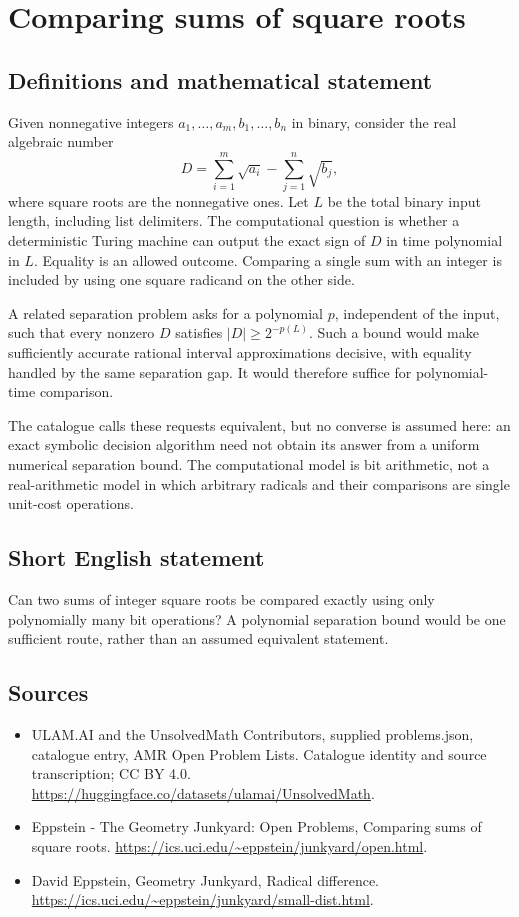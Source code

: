 \documentclass[11pt,a4paper]{article}
\begin{document}
\section*{Comparing sums of square roots}\label{statement}

\subsection{Definitions and mathematical statement}
Given nonnegative integers $a_1,\ldots,a_m,b_1,\ldots,b_n$ in binary,
consider the real algebraic number
\[
 D=\sum_{i=1}^m\sqrt{a_i}-\sum_{j=1}^n\sqrt{b_j},
\]
where square roots are the nonnegative ones. Let $L$ be the total binary
input length, including list delimiters. The computational question is
whether a deterministic Turing machine can output the exact sign of $D$
in time polynomial in $L$. Equality is an allowed outcome. Comparing a
single sum with an integer is included by using one square radicand on
the other side.

A related separation problem asks for a polynomial $p$, independent of
the input, such that every nonzero $D$ satisfies $|D|\ge2^{-p(L)}$.
Such a bound would make sufficiently accurate rational interval
approximations decisive, with equality handled by the same separation
gap. It would therefore suffice for polynomial-time comparison.

The catalogue calls these requests equivalent, but no converse is assumed
here: an exact symbolic decision algorithm need not obtain its answer
from a uniform numerical separation bound. The computational model is
bit arithmetic, not a real-arithmetic model in which arbitrary radicals
and their comparisons are single unit-cost operations.
\subsection{Short English statement}
Can two sums of integer square roots be compared exactly using only
polynomially many bit operations? A polynomial separation bound would be
one sufficient route, rather than an assumed equivalent statement.
\subsection{Sources}
\begin{itemize}
\item[S1] ULAM.AI and the UnsolvedMath Contributors, supplied problems.json, catalogue entry, AMR Open Problem Lists. Catalogue identity and source transcription; CC BY 4.0.
\url{https://huggingface.co/datasets/ulamai/UnsolvedMath}.
\item[S2] Eppstein - The Geometry Junkyard: Open Problems, Comparing sums of square roots. 
\url{https://ics.uci.edu/~eppstein/junkyard/open.html}.
\item[S3] David Eppstein, Geometry Junkyard, Radical difference.
\url{https://ics.uci.edu/~eppstein/junkyard/small-dist.html}.
\end{itemize}
\end{document}
